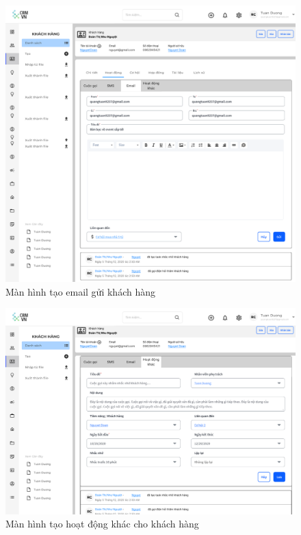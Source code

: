 \documentclass[12pt,a4paper]{article}
\begin{document}
\begin{enumerate}
\begin{itemize}
            \begin{figure}[H]
                \centering \includegraphics[width=\textwidth]{Img/Nguyet/Khachhang/emailKH.png}
                \vspace{0.5cm}
                \caption{Màn hình tạo email gửi khách hàng}
                \label{guiemailKH}
            \end{figure}

            \begin{figure}[H]
                \centering \includegraphics[width=\textwidth]{Img/Nguyet/Khachhang/HoatdongkhacKH.png}
                \vspace{0.5cm}
                \caption{Màn hình tạo hoạt động khác cho khách hàng}
                \label{taohoadongkhacKH}
            \end{figure}


\end{itemize}
\end{enumerate}
\end{document}

